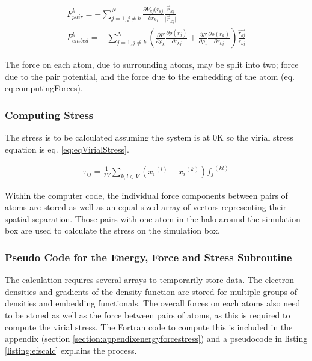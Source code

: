 \begin{equation}
\begin{split}
F^k_{pair} = -\sum \limits_{j=1, j \ne k}^{N} \frac{\partial V_{kj} (r_{kj}}{\partial r_{kj}} \frac{\vec{r}_{kj}}{\lvert\vec{r}_{kj}\lvert} \\
F^k_{embed} = -\sum \limits_{j=1, j \ne k}^{N} \left(\frac{\partial F}{\partial \rho_k} \frac{\partial \rho (r_{j})}{\partial r_{kj}} + \frac{\partial F}{\partial \rho_j} \frac{\partial \rho (r_{k})}{\partial r_{kj}} \right)  \frac{\vec{r_{kj}}}{r_{kj}}
\end{split}
\label{eq:computingForces}
\end{equation}

The force on each atom, due to surrounding atoms, may be split into two; force due to the pair potential, and the force due to the embedding of the atom (eq. eq:computingForces)\cite{dawbaskeseam}\cite{dlpolymanual}.


\subsubsection{Computing Stress}

The stress is to be calculated assuming the system is at 0K\cite{wikivirialstress} so the virial stress equation is eq. \ref{eq:eqVirialStress}.

\begin{equation}
\begin{split}
\tau_{ij} = \frac{1}{2 V} \sum_{k,l \in V} \left({x_i}^{(l)} - {x_i}^{(k)} \right) {f_j}^{(kl)}
\end{split}
\label{eq:eqVirialStress}
\end{equation}

Within the computer code, the individual force components between pairs of atoms are stored as well as an equal sized array of vectors representing their spatial separation.  Those pairs with one atom in the halo around the simulation box are used to calculate the stress on the simulation box.


\subsubsection{Pseudo Code for the Energy, Force and Stress Subroutine}

The calculation requires several arrays to temporarily store data.  The electron densities and gradients of the density function are stored for multiple groups of densities and embedding functionals.  The overall forces on each atoms also need to be stored as well as the force between pairs of atoms, as this is required to compute the virial stress.  The Fortran code to compute this is included in the appendix (section \ref{section:appendixenergyforcestress}) and a pseudocode in listing \ref{listing:efscalc} explains the process.

